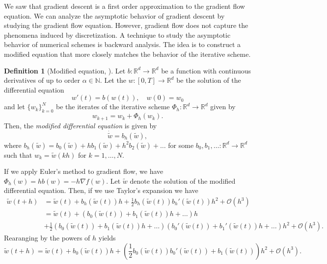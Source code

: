 \documentclass[12pt]{article}
\theoremstyle{definition}
\newtheorem{definition}[definition]{Definition}
\numberwithin{equation}{section}
\newcommand{\N}{\mathbb{N}}
\newcommand{\R}{\mathbb{R}}
\newcommand{\CO}{\mathcal{O}}
\begin{document}
We saw that gradient descent is a first order approximation to the gradient flow equation. We can analyze the asymptotic behavior of gradient descent by studying the gradient flow equation. However, gradient flow does not capture the phenomena induced by discretization. 
A technique to study the asymptotic behavior of numerical schemes is backward analysis. The idea is to construct a modified equation that more closely matches the behavior of the iterative scheme.
\begin{definition}[Modified equation, ]
  Let $b: \R^d \rightarrow \R^d$ be a function with continuous derivatives of up to order $\alpha \in \N$. Let the $w:[0,T] \rightarrow \R^d$ be the solution of the differential equation
  \begin{equation*}
    w'(t) = b(w(t)), \quad w(0) = w_0
  \end{equation*}
  and let $\{w_k\}_{k=0}^N$ be the iterates of the iterative scheme $\Phi_h : \R^d \rightarrow \R^d$ given by
  \begin{equation*}
    w_{k+1} = w_k + \Phi_h(w_k).
  \end{equation*}
  Then, the \emph{modified differential equation} is given by
  \begin{equation*}
    \dot{\tilde{w}} = b_h(\tilde{w}),
  \end{equation*}
  where $b_h(\tilde{w}) = b_0(\tilde{w}) + hb_1(\tilde{w}) + h^2b_2(\tilde{w})+\dots$
  for some $b_0, b_1, \dots : \R^d \rightarrow \R^d$ such that $w_k = \tilde{w}(kh)$ for $k=1,\dots,N$.
\end{definition}
If we apply Euler's method to gradient flow, we have $\Phi_h(w) = h b(w) = - h \nabla f(w)$. Let $\widetilde{w}$ denote the solution of the modified differential equation. Then, if we use Taylor's expansion we have
\begin{align*}
  \widetilde{w}(t+h) &= \widetilde{w}(t) + b_h(\widetilde{w}(t))h + \frac{1}{2}b_h(\widetilde{w}(t))b_h'(\widetilde{w}(t))h^2 + \CO(h^3) \\
  &= \widetilde{w}(t) + (b_0(\widetilde{w}(t)) + b_1(\widetilde{w}(t))h + \dots)h \\
  &+ \frac{1}{2}(b_0(\widetilde{w}(t)) + b_1(\widetilde{w}(t))h + \dots)(b_0'(\widetilde{w}(t)) + b_1'(\widetilde{w}(t))h + \dots)h^2 + \CO(h^3).
\end{align*}
Rearanging by the powers of $h$ yields
\begin{equation*}
  \widetilde{w}(t+h) = \widetilde{w}(t) + b_0(\widetilde{w}(t))h + \left( \frac{1}{2}b_0(\widetilde{w}(t))b_0'(\widetilde{w}(t)) + b_1(\widetilde{w}(t))\right)h^2 + \CO(h^3).
\end{equation*}
\end{document}
